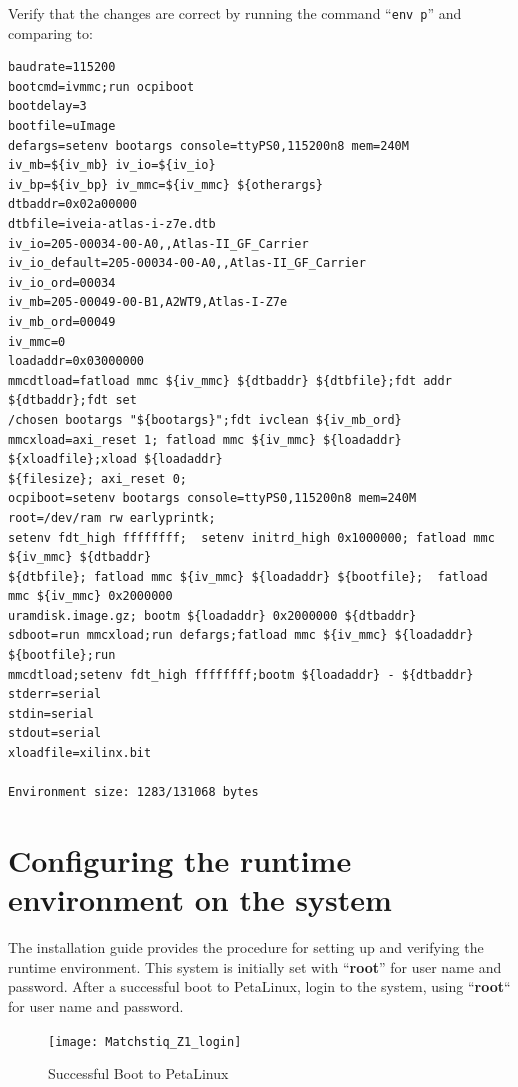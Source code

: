 \begin{flushleft}
Verify that the changes are correct by running the command ``\texttt{env p}'' and comparing to:
\end{flushleft}
\begin{verbatim}
baudrate=115200
bootcmd=ivmmc;run ocpiboot
bootdelay=3
bootfile=uImage
defargs=setenv bootargs console=ttyPS0,115200n8 mem=240M iv_mb=${iv_mb} iv_io=${iv_io}
iv_bp=${iv_bp} iv_mmc=${iv_mmc} ${otherargs}
dtbaddr=0x02a00000
dtbfile=iveia-atlas-i-z7e.dtb
iv_io=205-00034-00-A0,,Atlas-II_GF_Carrier
iv_io_default=205-00034-00-A0,,Atlas-II_GF_Carrier
iv_io_ord=00034
iv_mb=205-00049-00-B1,A2WT9,Atlas-I-Z7e
iv_mb_ord=00049
iv_mmc=0
loadaddr=0x03000000
mmcdtload=fatload mmc ${iv_mmc} ${dtbaddr} ${dtbfile};fdt addr ${dtbaddr};fdt set
/chosen bootargs "${bootargs}";fdt ivclean ${iv_mb_ord}
mmcxload=axi_reset 1; fatload mmc ${iv_mmc} ${loadaddr} ${xloadfile};xload ${loadaddr}
${filesize}; axi_reset 0;
ocpiboot=setenv bootargs console=ttyPS0,115200n8 mem=240M root=/dev/ram rw earlyprintk;
setenv fdt_high ffffffff;  setenv initrd_high 0x1000000; fatload mmc ${iv_mmc} ${dtbaddr}
${dtbfile}; fatload mmc ${iv_mmc} ${loadaddr} ${bootfile};  fatload mmc ${iv_mmc} 0x2000000
uramdisk.image.gz; bootm ${loadaddr} 0x2000000 ${dtbaddr}
sdboot=run mmcxload;run defargs;fatload mmc ${iv_mmc} ${loadaddr} ${bootfile};run
mmcdtload;setenv fdt_high ffffffff;bootm ${loadaddr} - ${dtbaddr}
stderr=serial
stdin=serial
stdout=serial
xloadfile=xilinx.bit

Environment size: 1283/131068 bytes
\end{verbatim}

\pagebreak
\section{Configuring the runtime environment on the system}
The installation guide provides the procedure for setting up and verifying the runtime environment.
This system is initially set with  ``\textbf{root}'' for user name and password.
After a successful boot to PetaLinux, login to the system, using  ``\textbf{root}`` for user name and password.

\begin{figure}[H]
	\centerline{\texttt{[image: Matchstiq\_Z1\_login]}}
	\caption{Successful Boot to PetaLinux}
	\label{fig:boot1}
\end{figure}

